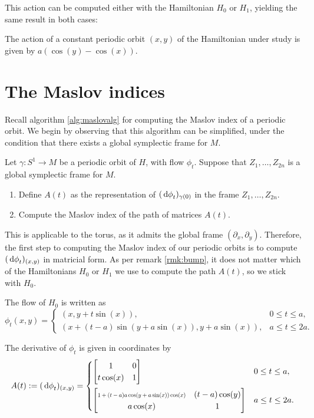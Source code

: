 This action can be computed either with the Hamiltonian $H_0$ or $H_1$, yielding the same result in both cases:
\begin{prop}
The action of a constant periodic orbit $(x,y)$ of the Hamiltonian under study is given by $a (\cos(y) - \cos(x))$.
\end{prop}

\section{The Maslov indices}

Recall algorithm \ref{alg:maslovalg} for computing the Maslov index of a periodic orbit. We begin by observing that this algorithm can be simplified, under the condition that there exists a global symplectic frame for $M$.

\begin{algorithm}
Let $\gamma \colon S^1 \to M$ be a periodic orbit of $H$, with flow $\phi_t$. Suppose that $Z_1, \dots, Z_{2n}$ is a global symplectic frame for $M$.
\begin{enumerate}[algorithm]
\item Define $A(t)$ as the representation of $(\dl \phi_t)_{\gamma(0)}$ in the frame $Z_1, \dots, Z_{2n}$.
\item Compute the Maslov index of the path of matrices $A(t)$.
\end{enumerate}
\end{algorithm}

This is applicable to the torus, as it admits the global frame $(\partial_x, \partial_y)$. Therefore, the first step to computing the Maslov index of our periodic orbits is to compute $(\dl \phi_t)_{(x,y)}$ in matricial form. As per remark \ref{rmk:bump}, it does not matter which of the Hamiltonians $H_0$ or $H_1$ we use to compute the path $A(t)$, so we stick with $H_0$.

The flow of $H_0$ is written as
\begin{equation}
\phi_t(x,y) = \begin{cases}
(x,y+t \sin(x)), & 0 \leq t \leq a,\\
(x+(t-a) \sin(y+a \sin(x)), y + a \sin(x)), & a \leq t \leq 2a.
\end{cases}
\end{equation}

The derivative of $\phi_t$ is given in coordinates by
\begin{equation}\label{dphi1}
A(t) := (\dl \phi_t)_{(x,y)} = \begin{cases}
\begin{bmatrix}
1 & 0\\
t \cos(x) & 1
\end{bmatrix} & 0 \leq t \leq a,\\[1.3em]
\begin{bmatrix}
\scalebox{0.7}{$1+(t-a) a \cos(y+a \sin(x)) \cos(x)$} &  (t-a) \cos(y)\\
a \cos(x) & 1
\end{bmatrix}
 & a \leq t \leq 2a.
\end{cases}
\end{equation}

